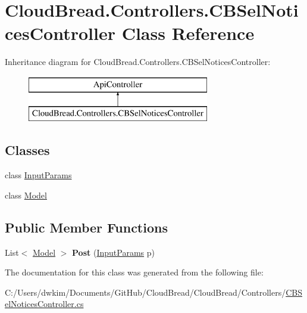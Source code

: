 \hypertarget{a00054}{}\section{Cloud\+Bread.\+Controllers.\+C\+B\+Sel\+Notices\+Controller Class Reference}
\label{a00054}
Inheritance diagram for Cloud\+Bread.\+Controllers.\+C\+B\+Sel\+Notices\+Controller\+:\begin{figure}[H]
\begin{center}
\leavevmode
\includegraphics[height=2.000000cm]{a00054}
\end{center}
\end{figure}
\subsection*{Classes}
\begin{DoxyCompactItemize}
\item 
class \hyperlink{a00100}{Input\+Params}
\item 
class \hyperlink{a00165}{Model}
\end{DoxyCompactItemize}
\subsection*{Public Member Functions}
\begin{DoxyCompactItemize}
\item 
List$<$ \hyperlink{a00165}{Model} $>$ {\bfseries Post} (\hyperlink{a00100}{Input\+Params} p)\hypertarget{a00054_af32bea5de221b42a7b4f4d96a70b9215}{}\label{a00054_af32bea5de221b42a7b4f4d96a70b9215}

\end{DoxyCompactItemize}


The documentation for this class was generated from the following file\+:\begin{DoxyCompactItemize}
\item 
C\+:/\+Users/dwkim/\+Documents/\+Git\+Hub/\+Cloud\+Bread/\+Cloud\+Bread/\+Controllers/\hyperlink{a00225}{C\+B\+Sel\+Notices\+Controller.\+cs}\end{DoxyCompactItemize}
